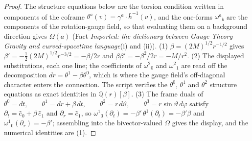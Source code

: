 \documentclass[11pt]{article}
\theoremstyle{definition}
\theoremstyle{plain}
\providecommand{\hb}{}\renewcommand{\hb}{\bar{h}}
\begin{document}
\begin{proof}
The structure equations below are the torsion condition written in components of the coframe $\theta^a(v) = \gamma^a \cdot \hb^{-1}(v)$, and the one-forms $\omega^a{}_b$ are the components of the rotation-gauge field, so that evaluating them on a background direction gives $\Omega(a)$ (Fact \emph{Imported: the dictionary between Gauge Theory Gravity and curved-spacetime language}(i) and (ii)). (1) $\beta = (2M)^{1/2} r^{-1/2}$ gives $\beta' = -\tfrac12 (2M)^{1/2} r^{-3/2} = -\beta/2r$ and $\beta\beta' = -\beta^2/2r = -M/r^2$. (2) The displayed substitutions, each one line; the coefficients of $\omega^2{}_0$ and $\omega^2{}_1$ are read off the decomposition $dr = \theta^1 - \beta\theta^0$, which is where the gauge field's off-diagonal character enters the connection. The script verifies the $\theta^0$, $\theta^1$ and $\theta^2$ structure equations as exact identities in $\mathbb{Q}(r)[\beta]$. (3) The frame duals of $\theta^0 = dt, \qquad \theta^1 = dr + \beta\,dt, \qquad \theta^2 = r\,d\vartheta, \qquad \theta^3 = r\sin\vartheta\,d\varphi$ satisfy $\partial_t = \hat e_0 + \beta\,\hat e_1$ and $\partial_r = \hat e_1$, so $\omega^1{}_0(\partial_t) = -\beta'\,\theta^1(\partial_t) = -\beta'\beta$ and $\omega^1{}_0(\partial_r) = -\beta'$; assembling into the bivector-valued $\Omega$ gives the display, and the numerical identities are (1).

\end{proof}
\end{document}

